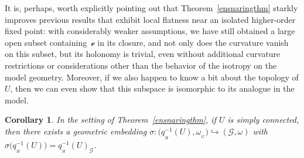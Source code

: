 \documentclass[10pt,a4paper]{amsart}
\numberwithin{equation}{section}
\newtheorem{Corollary}[Theorem]{Corollary}
\theoremstyle{definition}
\newcommand{\MC}[1]{\omega_{{}_{#1}}}
\begin{document}
It is, perhaps, worth explicitly pointing out that Theorem~\ref{ensnaringthm} starkly improves previous results that exhibit local flatness near an isolated higher-order fixed point: with considerably weaker assumptions, we have still obtained a large open subset  containing~$\mathscr{e}$ in its closure, and not only does the curvature vanish on this subset, but its holonomy is trivial, even without additional curvature restrictions or considerations other than the behavior of the isotropy on the model geometry. Moreover, if we also happen to know a bit about the topology of $U$, then we can even show that this subspace is isomorphic to its analogue in the model.

\begin{Corollary}\label{ensnaringthmcor} In the setting of Theorem~{\rm \ref{ensnaringthm}}, if $U$ is simply connected, then there exists a geometric embedding $\sigma\colon \bigl(q_{{}_H}^{-1}(U),\MC{G}\bigr)\hookrightarrow(\mathscr{G},\omega)$ with $\sigma\bigl(q_{{}_H}^{-1}(U)\bigr)=q_{{}_H}^{-1}(U)_\mathscr{G}$.
\end{Corollary}
\end{document}
